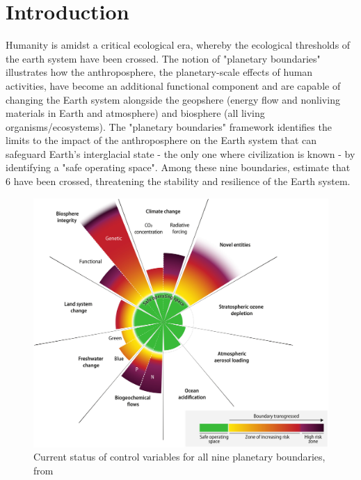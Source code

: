 {}
\onehalfspacing
\chapter*{Introduction}

Humanity is amidst a critical ecological era, whereby the ecological thresholds of the earth system have been crossed. The notion of "planetary boundaries" \citep{rockstrom2009safe,steffen_2015_planetary} illustrates how the anthroposphere, the planetary-scale effects of human activities, have become an additional functional component and are capable of changing the Earth system \citep{richardson_earth_2023} alongside the geopshere (energy flow and nonliving materials in Earth and atmosphere) and biosphere (all living organisms/ecosystems). The "planetary boundaries" framework identifies the limits to the impact of the anthroposphere on the Earth system that can safeguard Earth's interglacial state - the only one where civilization is known - by identifying a "safe operating space". Among these nine boundaries, \cite{richardson_earth_2023} estimate that 6 have been crossed, threatening the stability and resilience of the Earth system. 

\begin{figure}[h]
	\centering
	\includegraphics[width= .7\textwidth]{figures/intro/planetary_bounds.jpg}
	\caption{Current status of control variables for all nine planetary boundaries, from \cite{richardson_earth_2023}}
\end{figure}

